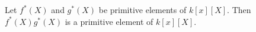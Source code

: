 Let $f^*(X)$ and $g^*(X)$ be primitive elements of $k[x][X]$. Then $f^*(X)g^*(X)$ is a primitive element of $k[x][X]$.
